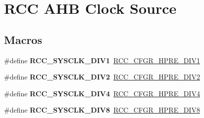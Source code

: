 \hypertarget{group___r_c_c___a_h_b___clock___source}{}\section{R\+CC A\+HB Clock Source}
\label{group___r_c_c___a_h_b___clock___source}
\subsection*{Macros}
\begin{DoxyCompactItemize}
\item 
\mbox{\label{group___r_c_c___a_h_b___clock___source_ga226f5bf675015ea677868132b6b83494}} 
\#define {\bfseries R\+C\+C\+\_\+\+S\+Y\+S\+C\+L\+K\+\_\+\+D\+I\+V1}~\mbox{\hyperlink{group___peripheral___registers___bits___definition_ga2b7d7f29b09a49c31404fc0d44645c84}{R\+C\+C\+\_\+\+C\+F\+G\+R\+\_\+\+H\+P\+R\+E\+\_\+\+D\+I\+V1}}
\item 
\mbox{\label{group___r_c_c___a_h_b___clock___source_gac37c0610458a92e3cb32ec81014625c3}} 
\#define {\bfseries R\+C\+C\+\_\+\+S\+Y\+S\+C\+L\+K\+\_\+\+D\+I\+V2}~\mbox{\hyperlink{group___peripheral___registers___bits___definition_gaa9eeb5e38e53e79b08a4ac438497ebea}{R\+C\+C\+\_\+\+C\+F\+G\+R\+\_\+\+H\+P\+R\+E\+\_\+\+D\+I\+V2}}
\item 
\mbox{\label{group___r_c_c___a_h_b___clock___source_ga6fd3652d6853563cdf388a4386b9d22f}} 
\#define {\bfseries R\+C\+C\+\_\+\+S\+Y\+S\+C\+L\+K\+\_\+\+D\+I\+V4}~\mbox{\hyperlink{group___peripheral___registers___bits___definition_gaffe860867ae4b1b6d28473ded1546d91}{R\+C\+C\+\_\+\+C\+F\+G\+R\+\_\+\+H\+P\+R\+E\+\_\+\+D\+I\+V4}}
\item 
\mbox{\label{group___r_c_c___a_h_b___clock___source_ga7def31373854ba9c72bb76b1d13e3aad}} 
\#define {\bfseries R\+C\+C\+\_\+\+S\+Y\+S\+C\+L\+K\+\_\+\+D\+I\+V8}~\mbox{\hyperlink{group___peripheral___registers___bits___definition_gaca71d6b42bdb83b5ff5320578869a058}{R\+C\+C\+\_\+\+C\+F\+G\+R\+\_\+\+H\+P\+R\+E\+\_\+\+D\+I\+V8}}
\item 
\mbox{\label{group___r_c_c___a_h_b___clock___source_ga895462b261e03eade3d0139cc1327a51}} 

\end{DoxyCompactItemize}
